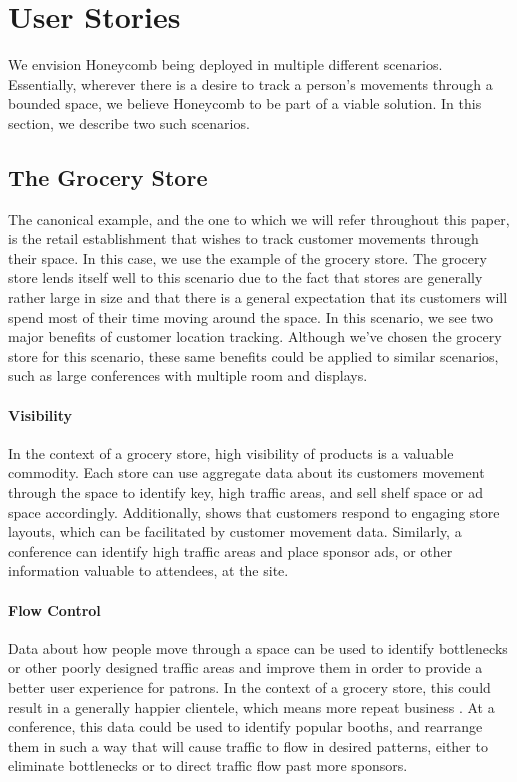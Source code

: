 \section{User Stories}
%

We envision Honeycomb being deployed in multiple different scenarios. Essentially, wherever there is a desire to track a person's movements through a bounded space, we believe Honeycomb to be part of a viable solution. In this section, we describe two such scenarios.

\subsection{The Grocery Store}
The canonical example, and the one to which we will refer throughout this paper, is the retail establishment that wishes to track customer movements through their space. In this case, we use the example of the grocery store. The grocery store lends itself well to this scenario due to the fact that stores are generally rather large in size and that there is a general expectation that its customers will spend most of their time moving around the space. In this scenario, we see two major benefits of customer location tracking.  Although we've chosen the grocery store for this scenario, these same benefits could be applied to similar scenarios, such as large conferences with multiple room and displays.

\paragraph{Visibility}

In the context of a grocery store, high visibility of products is a valuable commodity. Each store can use aggregate data about its customers movement through the space to identify key, high traffic areas, and sell shelf space or ad space accordingly. Additionally, \cite{shukla2013effects} shows that customers respond to engaging store layouts, which can be facilitated by customer movement data. Similarly, a conference can identify high traffic areas and place sponsor ads, or other information valuable to attendees, at the site.

\paragraph{Flow Control}

Data about how people move through a space can be used to identify bottlenecks or other poorly designed traffic areas and improve them in order to provide a better user experience for patrons. In the context of a grocery store, this could result in a generally happier clientele, which means more repeat business \cite{shukla2013effects}. At a conference, this data could be used to identify popular booths, and rearrange them in such a way that will cause traffic to flow in desired patterns, either to eliminate bottlenecks or to direct traffic flow past more sponsors.

